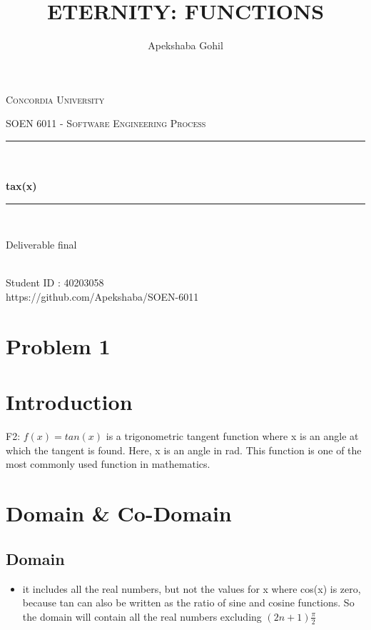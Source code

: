 \documentclass[a4paper, 11pt]{article}
\title{ETERNITY: FUNCTIONS}
\author{Apekshaba Gohil}
\date{}
\makeatletter
\let\thetitle\@title
\let\theauthor\@author
\makeatother
\begin{document}
\begin{titlepage}
	\centering
    \vspace*{0.5 cm}
\begin{center}    \textsc{\Large Concordia University}\\[2.0 cm]	\end{center}
	\textsc{\Large  SOEN 6011 - Software Engineering Process }\\[0.5 cm]
	\rule{\linewidth}{0.2 mm} \\[0.4 cm]
	{ \huge \textbf \thetitle}\\[0.2 cm]
	{ \huge \textbf{tax(x)}}
	\rule{\linewidth}{0.2 mm} \\[1.5 cm]

\begin{center}   {\Large Deliverable final}\\[2.0 cm]
\end{center}	
\begin{center}   {\Large \textbf{\theauthor}} \\[0.2 cm]
                 {\large Student ID : 40203058 }\\[1.5 cm]
              
                 {\large https://github.com/Apekshaba/SOEN-6011}
\end{center}
	
\end{titlepage}

\section*{Problem 1}
\section{Introduction}

F2:  $f(x)= tan(x)$ is a trigonometric tangent function where x is an angle at which the tangent is found. Here, x is an angle in rad. This function is one of the most commonly used function in mathematics.

\section{Domain \& Co-Domain}

\subsection{Domain}
\begin{itemize}
  \item it includes all the real numbers,
   but not the values for x where cos(x) is zero, because tan can also be written as the ratio of sine and cosine functions. So the domain will contain all the real numbers excluding  $ {( 2n+1)}\frac{\pi}{2} $	
 \end{itemize}
  
\end{document}
